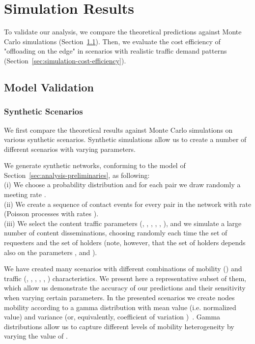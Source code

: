 \documentclass[10pt,conference,letterpaper]{IEEEtran}
\begin{document}
\section{Simulation Results}\label{sec:single-validation}
To validate our analysis, we compare the theoretical predictions against Monte Carlo simulations (Section~\ref{sec:model-validation}). Then, we evaluate the cost efficiency of "offloading on the edge" in scenarios with realistic traffic demand patterns (Section~\ref{sec:simulation-cost-efficiency}).


\subsection{Model Validation}\label{sec:model-validation}

\subsubsection{Synthetic Scenarios}
We first compare the theoretical results against Monte Carlo simulations on various synthetic scenarios. Synthetic simulations allow us to create a number of different scenarios with varying parameters.

We generate synthetic networks, conforming to the model of Section~\ref{sec:analysis-preliminaries}, as following:\\
(i) We choose a probability distribution  and for each pair  we draw randomly a meeting rate .\\
(ii) We create a sequence of contact events for every pair in the network with rate (Poisson processes with rates ).\\
(iii) We select the content traffic parameters (, , , , , ), and we simulate a large number of content disseminations, choosing randomly each time the set of requesters and the set of holders (note, however, that the set of holders depends also on the parameters ,  and ).

We have created many scenarios with different combinations of mobility () and traffic (, , , , , ) characteristics. We present here a representative subset of them, which allow us demonstrate the accuracy of our predictions and their sensitivity when varying certain parameters. In the presented scenarios we create nodes mobility according to a gamma distribution  with mean value  (i.e. normalized value) and variance  (or, equivalently, coefficient of variation )~\cite{passarella-dunbar-journal}. Gamma distributions allow us to capture different levels of mobility heterogeneity by varying the value of . 
\end{document}
